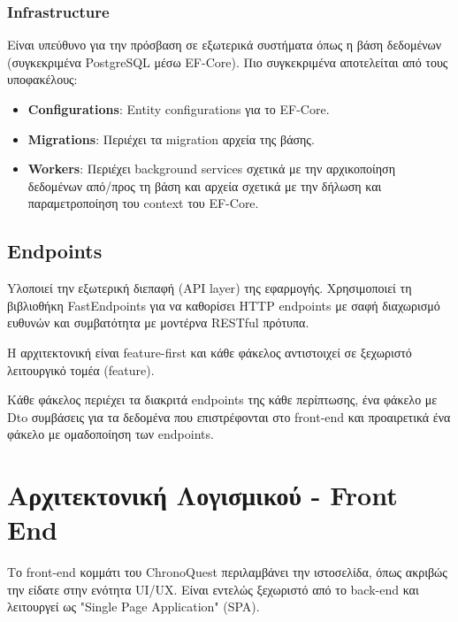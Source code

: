 \subsubsection{\textlatin{Infrastructure}}
Είναι υπεύθυνο για την πρόσβαση σε εξωτερικά συστήματα όπως η βάση δεδομένων (συγκεκριμένα \textlatin{PostgreSQL} μέσω \textlatin{EF-Core}). Πιο συγκεκριμένα αποτελείται από τους υποφακέλους:
\begin{itemize}
    \item \textbf{\textlatin{Configurations}}: \textlatin{Entity configurations} για το \textlatin{EF-Core}.
    \item \textbf{\textlatin{Migrations}}: Περιέχει τα \textlatin{migration} αρχεία της βάσης.
    \item \textbf{\textlatin{Workers}}: Περιέχει \textlatin{background services} σχετικά με την αρχικοποίηση δεδομένων από/προς τη βάση και αρχεία σχετικά με την δήλωση και παραμετροποίηση του \textlatin{context} του \textlatin{EF-Core}.
\end{itemize}


\subsection{\textlatin{Endpoints}}
Yλοποιεί την εξωτερική διεπαφή (\textlatin{API layer}) της εφαρμογής. Χρησιμοποιεί τη βιβλιοθήκη \textlatin{FastEndpoints} για να καθορίσει \textlatin{HTTP endpoints} με σαφή διαχωρισμό ευθυνών και συμβατότητα με μοντέρνα \textlatin{RESTful} πρότυπα.

Η αρχιτεκτονική είναι \textlatin{feature-first} και κάθε φάκελος αντιστοιχεί σε ξεχωριστό λειτουργικό τομέα (\textlatin{feature}).

Κάθε φάκελος περιέχει τα διακριτά \textlatin{endpoints} της κάθε περίπτωσης, ένα φάκελο με \textlatin{Dto} συμβάσεις για τα δεδομένα που επιστρέφονται στο \textlatin{front-end} και προαιρετικά ένα φάκελο με ομαδοποίηση των \textlatin{endpoints}.

\section{Αρχιτεκτονική Λογισμικού - \textlatin{Front End}}
Το \textlatin{front-end} κομμάτι του \textlatin{ChronoQuest} περιλαμβάνει την ιστοσελίδα, όπως ακριβώς την είδατε στην ενότητα \textlatin{UI/UX}. Είναι εντελώς ξεχωριστό από το \textlatin{back-end} και λειτουργεί ως \textlatin{"Single Page Application" (SPA)}.

